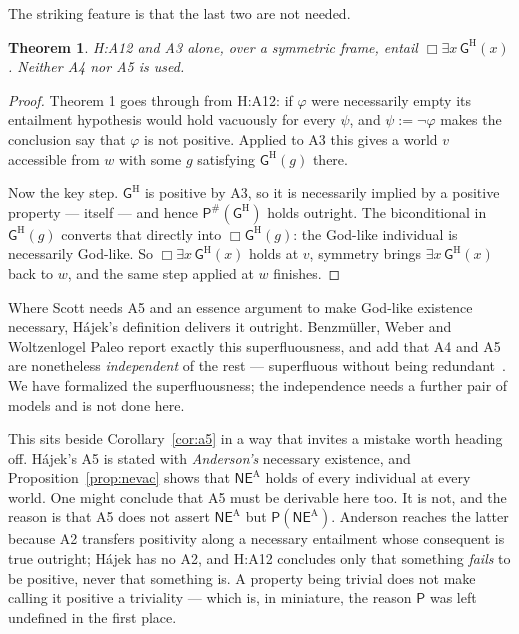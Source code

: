 \documentclass[11pt]{article}
\theoremstyle{plain}
\newtheorem{theorem}{Theorem}
\theoremstyle{definition}
\newcommand{\NE}{\mathsf{NE}}
\newcommand{\Gd}{\mathsf{G}}
\newcommand{\Pos}{\mathsf{P}}
\begin{document}
The striking feature is that the last two are not needed.

\begin{theorem}\label{thm:hajT3}
{\rm H:A12} and {\rm A3} alone, over a symmetric frame, entail
$\Box\exists x\,\Gd^{\mathrm{H}}(x)$. Neither {\rm A4} nor {\rm A5} is used.
\end{theorem}

\begin{proof}
Theorem 1 goes through from H:A12: if $\varphi$ were necessarily empty its
entailment hypothesis would hold vacuously for every $\psi$, and $\psi := \neg\varphi$
makes the conclusion say that $\varphi$ is not positive. Applied to A3 this
gives a world $v$ accessible from $w$ with some $g$ satisfying
$\Gd^{\mathrm{H}}(g)$ there.

Now the key step. $\Gd^{\mathrm{H}}$ is positive by A3, so it is necessarily
implied by a positive property --- itself --- and hence
$\Pos^{\#}(\Gd^{\mathrm{H}})$ holds outright. The biconditional in
$\Gd^{\mathrm{H}}(g)$ converts that directly into $\Box\Gd^{\mathrm{H}}(g)$:
the God-like individual is necessarily God-like. So
$\Box\exists x\,\Gd^{\mathrm{H}}(x)$ holds at $v$, symmetry brings
$\exists x\,\Gd^{\mathrm{H}}(x)$ back to $w$, and the same step applied at $w$
finishes.
\end{proof}

\noindent
Where Scott needs A5 and an essence argument to make God-like existence
necessary, H\'ajek's definition delivers it outright. Benzm\"uller, Weber and
Woltzenlogel Paleo report exactly this superfluousness, and add that A4 and A5
are nonetheless \emph{independent} of the rest --- superfluous without being
redundant~\cite{bww2017}. We have formalized the superfluousness; the
independence needs a further pair of models and is not done here.

This sits beside Corollary~\ref{cor:a5} in a way that invites a mistake worth
heading off. H\'ajek's A5 is stated with \emph{Anderson's} necessary existence,
and Proposition~\ref{prop:nevac} shows that $\NE^{\mathrm{A}}$ holds of every
individual at every world. One might conclude that A5 must be derivable here
too. It is not, and the reason is that A5 does not assert $\NE^{\mathrm{A}}$
but $\Pos(\NE^{\mathrm{A}})$. Anderson reaches the latter because A2 transfers
positivity along a necessary entailment whose consequent is true outright;
H\'ajek has no A2, and H:A12 concludes only that something \emph{fails} to be
positive, never that something is. A property being trivial does not make
calling it positive a triviality --- which is, in miniature, the reason
$\Pos$ was left undefined in the first place.
\end{document}
